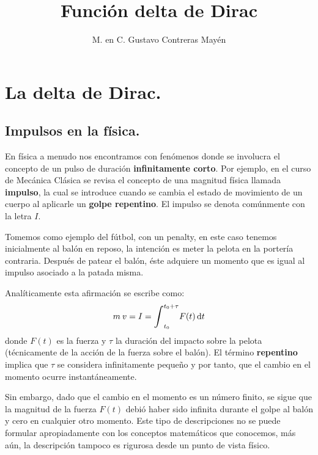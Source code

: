 \documentclass[12pt]{article}
\title{Función delta de Dirac}
\author{M. en C. Gustavo Contreras Mayén}
\date{ }
\def\scaleint#1{\vcenter{\hbox{\scaleto[3ex]{\displaystyle\int}{#1}}}}
\numberwithin{equation}{section}
\begin{document}
\maketitle
\fontsize{14}{14}\selectfont
{}
\tableofcontents
\newpage

\section{La delta de Dirac.}
\subsection{Impulsos en la física.}

En física a menudo nos encontramos con fenómenos donde se involucra el concepto de un pulso de duración \textbf{infinitamente corto}. Por ejemplo, en el curso de Mecánica Clásica se revisa el concepto de una magnitud física llamada \textbf{impulso},  la cual se introduce cuando se cambia el estado de movimiento de un cuerpo al aplicarle un \textbf{golpe repentino}. El impulso se denota comúnmente con la letra $I$.
\par
Tomemos como ejemplo del fútbol, con un penalty,  en este caso tenemos inicialmente al balón en reposo, la intención es meter la pelota en la portería contraria. Después de patear el balón, éste adquiere un momento que es igual al impulso asociado a la patada misma.
\par
Analíticamente esta afirmación se escribe como:
\begin{align*}
m \: v = I = \scaleint{6ex}_{t_{0}}^{t_{0} + \tau} F (t) \dd{t}
\end{align*}
donde $F(t)$ es la fuerza y $\tau$ la duración del impacto sobre la pelota (técnicamente de la acción de la fuerza sobre el balón). El término \textbf{repentino} implica que $\tau$ se considera infinitamente pequeño y por tanto, que el cambio en el momento ocurre instantáneamente.
\par
Sin embargo, dado que el cambio en el momento es un número finito,  se sigue que la magnitud de la fuerza $F (t)$ debió haber sido infinita durante el golpe al balón y cero en cualquier otro momento. Este tipo de descripciones no se puede formular apropiadamente con los conceptos matemáticos que conocemos, más aún, la descripción tampoco es rigurosa desde un punto de vista físico.
\end{document}
